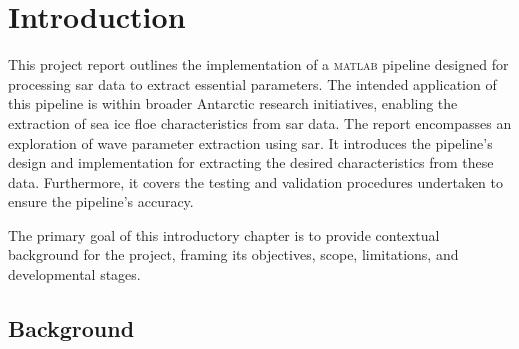 \chapter{Introduction}
\label{ch:intro}





This project report outlines the implementation of a \textsc{matlab} pipeline designed for processing \ac{sar} data to extract essential parameters. The intended application of this pipeline is within broader Antarctic research initiatives, enabling the extraction of sea ice floe characteristics from \acs{sar} data. The report encompasses an exploration of wave parameter extraction using \acs{sar}. It introduces the pipeline's design and implementation for extracting the desired characteristics from these data. Furthermore, it covers the testing and validation procedures undertaken to ensure the pipeline's accuracy.

The primary goal of this introductory chapter is to provide contextual background for the project, framing its objectives, scope, limitations, and developmental stages.
\section{Background}
\label{sec:intro.background}


